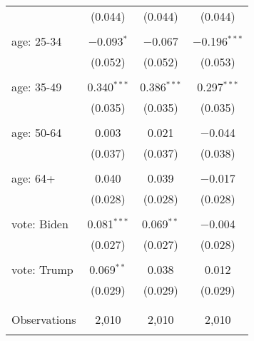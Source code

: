 \begin{tabular}{@{\extracolsep{5pt}}lccc}
  & (0.044) & (0.044) & (0.044) \\ 
  & & & \\ 
 age: 25-34 & $-$0.093$^{*}$ & $-$0.067 & $-$0.196$^{***}$ \\ 
  & (0.052) & (0.052) & (0.053) \\ 
  & & & \\ 
 age: 35-49 & 0.340$^{***}$ & 0.386$^{***}$ & 0.297$^{***}$ \\ 
  & (0.035) & (0.035) & (0.035) \\ 
  & & & \\ 
 age: 50-64 & 0.003 & 0.021 & $-$0.044 \\ 
  & (0.037) & (0.037) & (0.038) \\ 
  & & & \\ 
 age: 64+ & 0.040 & 0.039 & $-$0.017 \\ 
  & (0.028) & (0.028) & (0.028) \\ 
  & & & \\ 
 vote: Biden & 0.081$^{***}$ & 0.069$^{**}$ & $-$0.004 \\ 
  & (0.027) & (0.027) & (0.028) \\ 
  & & & \\ 
 vote: Trump & 0.069$^{**}$ & 0.038 & 0.012 \\ 
  & (0.029) & (0.029) & (0.029) \\ 
  & & & \\ 
\hline \\[-1.8ex] 

Observations & 2,010 & 2,010 & 2,010 \\ 
\hline 
\hline \\[-1.8ex] 
\end{tabular} 